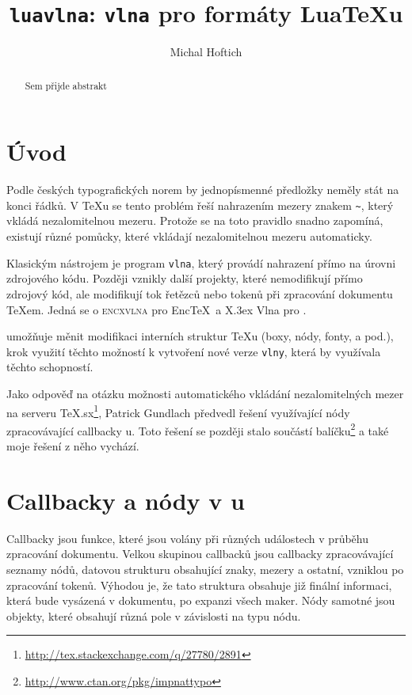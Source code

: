 \documentclass{csbulletin}
\begin{document}
\title{\texttt{luavlna}: \texttt{vlna} pro formáty Lua\TeX u}
\author{Michal Hoftich}
\maketitle
\begin{abstract}
Sem přijde abstrakt
\end{abstract}

\section{Úvod}
Podle českých typografických norem by jednopísmenné předložky neměly stát na 
konci řádků. V \TeX u se tento problém řeší nahrazením mezery znakem \verb|~|,
který vkládá nezalomitelnou mezeru. Protože se na toto pravidlo snadno zapomíná,
existují různé pomůcky, které vkládají nezalomitelnou mezeru automaticky.

Klasickým nástrojem je program \verb|vlna|, který provádí nahrazení přímo na
úrovni zdrojového kódu. Později vznikly další projekty, které nemodifikují přímo
zdrojový kód, ale modifikují tok řetězců nebo tokenů při zpracování dokumentu 
\TeX em. Jedná se o \textsc{encxvlna} pro Enc\TeX\ a X\raisebox{\myminus.5ex}{Ǝ}\kern\myminus.3ex Vlna pro .

 umožňuje měnit 
modifikaci interních struktur \TeX u 
(boxy, nódy, fonty, a pod.),  krok využití těchto možností
k vytvoření nové verze \verb|vlny|, která by využívala těchto schopností. 

Jako odpověď na otázku možnosti automatického vkládání nezalomitelných mezer 
na serveru TeX.sx\footnote{\url{http://tex.stackexchange.com/q/27780/2891}}, 
Patrick Gundlach předvedl řešení využívající nódy zpracovávající callbacky 
u. Toto řešení se později stalo součástí balíčku\footnote{%
\url{http://www.ctan.org/pkg/impnattypo}} a také moje řešení z něho vychází.

\section{Callbacky a nódy v u}




Callbacky jsou funkce, které jsou volány při různých událostech v průběhu
zpracování dokumentu. Velkou skupinou callbacků jsou callbacky zpracovávající 
seznamy nódů, datovou strukturu obsahující znaky, mezery a ostatní, vzniklou po
zpracování tokenů. Výhodou je, že tato struktura obsahuje již finální informaci,
která bude vysázená v dokumentu, po expanzi všech maker. Nódy samotné jsou 
objekty, které obsahují různá pole v závislosti na typu nódu.
\end{document}
